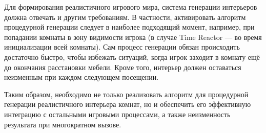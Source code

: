 Для формирования реалистичного игрового мира, система генерации интерьеров должна отвечать и другим требованиям. В частности, активировать алгоритм процедурной генерации следует в наиболее подходящий момент, например, при попадании комнаты в зону видимости игрока (в случае Time Reactor --- во время инициализации всей комнаты). Сам процесс генерации обязан происходить достаточно быстро, чтобы избежать ситуаций, когда игрок заходит в комнату ещё до окончания расстановки мебели. Кроме того, интерьер должен оставаться неизменным при каждом следующем посещении.

Таким образом, необходимо не только реализовать алгоритм для процедурной генерации реалистичного интерьера комнат, но и обеспечить его эффективную интеграцию с остальными игровыми процессами, а также неизменность результата при многократном вызове.
